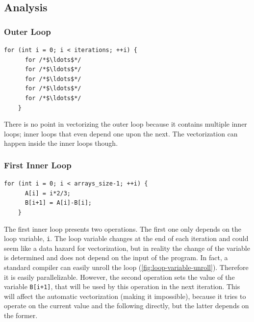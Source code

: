 \documentclass[
    12pt, %
]{fphw}
\newcommand{\tech}{\texttt}
\begin{document}
\subsection{Analysis}

\subsubsection{Outer Loop}

\begin{lstlisting}[gobble=4]
    for (int i = 0; i < iterations; ++i) {
      for /*$\ldots$*/
      for /*$\ldots$*/
      for /*$\ldots$*/
      for /*$\ldots$*/
      for /*$\ldots$*/
    }
\end{lstlisting}

    There is no point in vectorizing the outer loop because it contains multiple inner loops;
inner loops that even depend one upon the next.
The vectorization can happen inside the inner loops though.

\newpage

\subsubsection{First Inner Loop}

\begin{lstlisting}[gobble=4]
    for (int i = 0; i < arrays_size-1; ++i) {
      A[i] = i*2/3;
      B[i+1] = A[i]-B[i];
    }

\end{lstlisting}

    The first inner loop presents two operations.
The first one only depends on the loop variable, \tech{i}.
The loop variable changes at the end of each iteration and
could seem like a data hazard for vectorization, but in reality
the change of the variable is determined and does not depend on the input of the program.
In fact, a standard compiler can easily unroll the loop (\cref{fig:loop-variable-unroll}).
Therefore it is easily parallelizable.
However, the second operation sets the value of the variable \tech{B[i+1]},
that will be used by this operation in the next iteration.
This will affect the automatic vectorization (making it impossible),
because it tries to operate on the current value and the following directly,
but the latter depends on the former.
\end{document}
